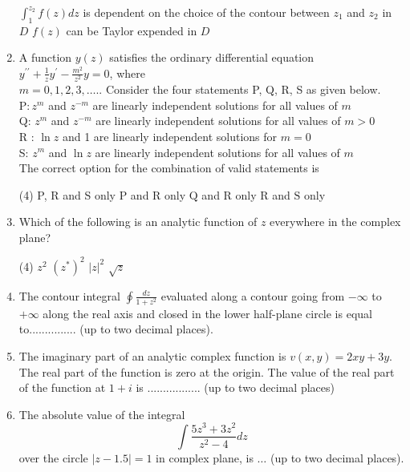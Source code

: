 \begin{enumerate}[label=\color{ocre}\textbf{\arabic*.}]
\begin{tasks}
		\task[\textbf{C.}] $\int_{1}^{z_{2}} f(z) d z$ is dependent on the choice of the contour between $z_{1}$ and $z_{2}$ in $D$
		\task[\textbf{D.}]  $f(z)$ can be Taylor expended in $D$
	\end{tasks}
	\item A function $y(z)$ satisfies the ordinary differential equation $y^{\prime \prime}+\frac{1}{z} y^{\prime}-\frac{m^{2}}{z^{2}} y=0$, where\\
	$m=0,1,2,3, \ldots . .$ Consider the four statements P, Q, R, S as given below.\\
	$\mathrm{P}: z^{m}$ and $z^{-m}$ are linearly independent solutions for all values of $m$\\
	Q: $z^{m}$ and $z^{-m}$ are linearly independent solutions for all values of $m>0$\\
	$\mathrm{R}$ : $\ln z$ and 1 are linearly independent solutions for $m=0$\\
	S: $z^{m}$ and $\ln z$ are linearly independent solutions for all values of $m$\\
	The correct option for the combination of valid statements is
	{}
	\begin{tasks}(4)
		\task[\textbf{A.}] P, R and S only
		\task[\textbf{B.}]  P and R only
		\task[\textbf{C.}] $\mathrm{Q}$ and $\mathrm{R}$ only
		\task[\textbf{D.}] $\mathrm{R}$ and $\mathrm{S}$ only
	\end{tasks}
	\item  Which of the following is an analytic function of $z$ everywhere in the complex plane?
	{}
	\begin{tasks}(4)
		\task[\textbf{A.}] $z^{2}$
		\task[\textbf{B.}]  $\left(z^{*}\right)^{2}$
		\task[\textbf{C.}] $|z|^{2}$
		\task[\textbf{D.}] $\sqrt{z}$
	\end{tasks}
	\item The contour integral $\oint \frac{d z}{1+z^{2}}$ evaluated along a contour going from $-\infty$ to $+\infty$ along the
	real axis and closed in the lower half-plane circle is equal to............... (up to two decimal places).
	{}
	\item The imaginary part of an analytic complex function is $v(x, y)=2 x y+3 y .$ The real part of the function is zero at the origin. The value of the real part of the function at $1+i$ is ................. (up to two decimal places)
	{}
	\item The absolute value of the integral
	$$
	\int \frac{5 z^{3}+3 z^{2}}{z^{2}-4} d z
	$$
	over the circle $|z-1.5|=1$ in complex plane, is $\ldots$ (up to two decimal places).

\end{enumerate}
